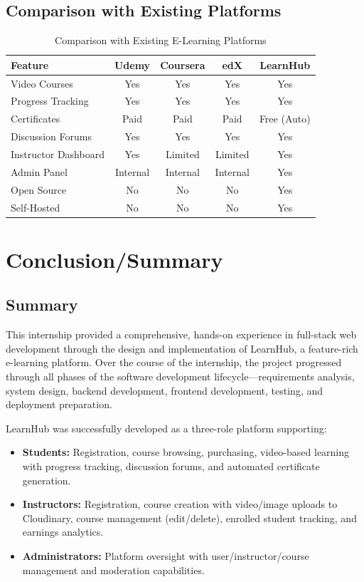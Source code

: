 \documentclass[12pt,a4paper]{report}
\begin{document}
\section{Comparison with Existing Platforms}
\begin{table}[H]
\centering
\caption{Comparison with Existing E-Learning Platforms}
\begin{tabular}{@{}lcccc@{}}
\toprule
\textbf{Feature} & \textbf{Udemy} & \textbf{Coursera} & \textbf{edX} & \textbf{LearnHub} \\ \midrule
Video Courses        & Yes & Yes & Yes & Yes \\
Progress Tracking    & Yes & Yes & Yes & Yes \\
Certificates         & Paid & Paid & Paid & Free (Auto) \\
Discussion Forums    & Yes & Yes & Yes & Yes \\
Instructor Dashboard & Yes & Limited & Limited & Yes \\
Admin Panel          & Internal & Internal & Internal & Yes \\
Open Source          & No & No & No & Yes \\
Self-Hosted          & No & No & No & Yes \\ \bottomrule
\end{tabular}
\end{table}


\chapter{Conclusion/Summary}

\section{Summary}
This internship provided a comprehensive, hands-on experience in full-stack web development through the design and implementation of LearnHub, a feature-rich e-learning platform. Over the course of the internship, the project progressed through all phases of the software development lifecycle---requirements analysis, system design, backend development, frontend development, testing, and deployment preparation.

LearnHub was successfully developed as a three-role platform supporting:
\begin{itemize}
    \item \textbf{Students:} Registration, course browsing, purchasing, video-based learning with progress tracking, discussion forums, and automated certificate generation.
    \item \textbf{Instructors:} Registration, course creation with video/image uploads to Cloudinary, course management (edit/delete), enrolled student tracking, and earnings analytics.
    \item \textbf{Administrators:} Platform oversight with user/instructor/course management and moderation capabilities.
\end{itemize}
\end{document}
